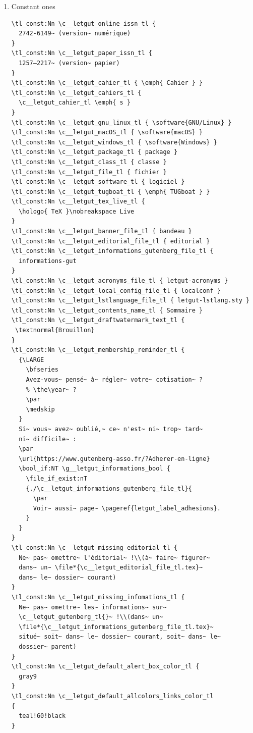 \documentclass{letgut}
\begin{document}
\begin{enumerate}
\item Constant ones
\label{sec:orgb1ea800}

\begin{lstlisting}
\tl_const:Nn \c__letgut_online_issn_tl {
  2742-6149~ (version~ numérique)
}
\tl_const:Nn \c__letgut_paper_issn_tl {
  1257–2217~ (version~ papier)
}
\tl_const:Nn \c__letgut_cahier_tl { \emph{ Cahier } }
\tl_const:Nn \c__letgut_cahiers_tl {
  \c__letgut_cahier_tl \emph{ s }
}
\tl_const:Nn \c__letgut_gnu_linux_tl { \software{GNU/Linux} }
\tl_const:Nn \c__letgut_macOS_tl { \software{macOS} }
\tl_const:Nn \c__letgut_windows_tl { \software{Windows} }
\tl_const:Nn \c__letgut_package_tl { package }
\tl_const:Nn \c__letgut_class_tl { classe }
\tl_const:Nn \c__letgut_file_tl { fichier }
\tl_const:Nn \c__letgut_software_tl { logiciel }
\tl_const:Nn \c__letgut_tugboat_tl { \emph{ TUGboat } }
\tl_const:Nn \c__letgut_tex_live_tl {
  \hologo{ TeX }\nobreakspace Live
}
\tl_const:Nn \c__letgut_banner_file_tl { bandeau }
\tl_const:Nn \c__letgut_editorial_file_tl { editorial }
\tl_const:Nn \c__letgut_informations_gutenberg_file_tl {
  informations-gut
}
\tl_const:Nn \c__letgut_acronyms_file_tl { letgut-acronyms }
\tl_const:Nn \c__letgut_local_config_file_tl { localconf }
\tl_const:Nn \c__letgut_lstlanguage_file_tl { letgut-lstlang.sty }
\tl_const:Nn \c__letgut_contents_name_tl { Sommaire }
\tl_const:Nn \c__letgut_draftwatermark_text_tl {
 \textnormal{Brouillon}
}
\tl_const:Nn \c__letgut_membership_reminder_tl {
  {\LARGE
    \bfseries
    Avez-vous~ pensé~ à~ régler~ votre~ cotisation~ ?
    % \the\year~ ?
    \par
    \medskip
  }
  Si~ vous~ avez~ oublié,~ ce~ n'est~ ni~ trop~ tard~
  ni~ difficile~ :
  \par
  \url{https://www.gutenberg-asso.fr/?Adherer-en-ligne}
  \bool_if:NT \g__letgut_informations_bool {
    \file_if_exist:nT
    {./\c__letgut_informations_gutenberg_file_tl}{
      \par
      Voir~ aussi~ page~ \pageref{letgut_label_adhesions}.
    }
  }
}
\tl_const:Nn \c__letgut_missing_editorial_tl {
  Ne~ pas~ omettre~ l'éditorial~ !\\(à~ faire~ figurer~
  dans~ un~ \file*{\c__letgut_editorial_file_tl.tex}~
  dans~ le~ dossier~ courant)
}
\tl_const:Nn \c__letgut_missing_infomations_tl {
  Ne~ pas~ omettre~ les~ informations~ sur~
  \c__letgut_gutenberg_tl{}~ !\\(dans~ un~
  \file*{\c__letgut_informations_gutenberg_file_tl.tex}~
  situé~ soit~ dans~ le~ dossier~ courant, soit~ dans~ le~
  dossier~ parent)
}
\tl_const:Nn \c__letgut_default_alert_box_color_tl {
  gray9
}
\tl_const:Nn \c__letgut_default_allcolors_links_color_tl
{
  teal!60!black
}
\end{lstlisting}


\end{enumerate}
\end{document}
